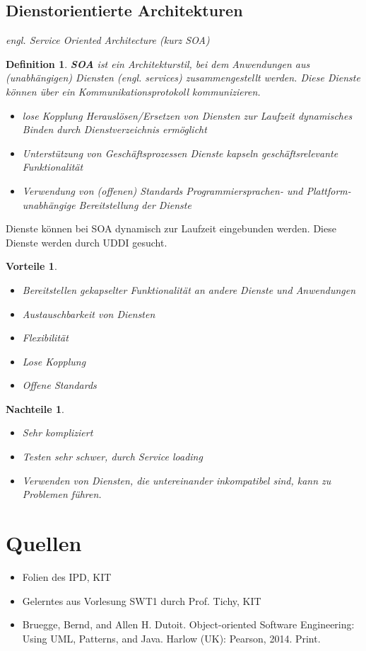 \documentclass[a4paper]{article}
\theoremstyle{break}
\newtheorem{defi}{Definition}[section]
\newtheorem{why}{Vorteile}[section]
\newtheorem{whynot}{Nachteile}[section]
\begin{document}
\subsection{Dienstorientierte Architekturen}
\textit{engl. Service Oriented Architecture (kurz SOA)}
\begin{defi}
	\textbf{SOA} ist ein Architekturstil, bei dem Anwendungen aus (unabhängigen) Diensten (engl. services) zusammengestellt werden. Diese Dienste können über ein Kommunikationsprotokoll kommunizieren.
	\begin{itemize}
		\item lose Kopplung
		\subitem Herauslösen/Ersetzen von Diensten zur Laufzeit
		\subitem dynamisches Binden durch Dienstverzeichnis ermöglicht
		\item Unterstützung von Geschäftsprozessen
		\subitem Dienste kapseln geschäftsrelevante Funktionalität
		\item Verwendung von (offenen) Standards
		\subitem Programmiersprachen- und Plattform-unabhängige Bereitstellung der Dienste
		
	\end{itemize}
\end{defi}
Dienste können bei SOA dynamisch zur Laufzeit eingebunden werden. Diese Dienste werden durch UDDI gesucht. 
\begin{why}
	\begin{itemize}
		\item Bereitstellen gekapselter Funktionalität an andere Dienste und Anwendungen
		\item Austauschbarkeit von Diensten
		\item Flexibilität
		\item Lose Kopplung
		\item Offene Standards
	\end{itemize}
\end{why}
\begin{whynot}
	\begin{itemize}
		\item Sehr kompliziert
		\item Testen sehr schwer, durch Service loading
		\item Verwenden von Diensten, die untereinander inkompatibel sind, kann zu Problemen führen.
	\end{itemize}
\end{whynot}
\newpage
\appendix
\section{Quellen}
\begin{itemize}
	\item Folien des IPD, KIT
	\item Gelerntes aus Vorlesung SWT1 durch Prof. Tichy, KIT
	\item Bruegge, Bernd, and Allen H. Dutoit. Object-oriented Software Engineering: Using UML, Patterns, and Java. Harlow (UK): Pearson, 2014. Print. 
\end{itemize}
\end{document}
